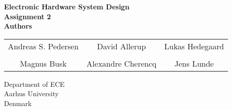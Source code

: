 \documentclass[../main.tex]{subfiles}
\begin{document}
\thispagestyle{empty}

\begin{titlepage}
    \begin{center}
        \vspace*{20pt}
        \textbf{\huge{Electronic Hardware System Design}} \\
        \vspace*{20pt}
        \textbf{\large{Assignment 2}} \\
        \vspace*{50pt}
        \textbf{\Large{Authors}} \\
        \vspace{20pt}
        \begin{tabular}{c c c}
            Andreas S. Pedersen & David Allerup & Lukas Hedegaard \\
             && \\
            Magnus Busk & Alexandre Cherencq & Jens Lunde \\
        \end{tabular}

        \vfill
        \vspace*{3cm}
        Department of ECE\\
        Aarhus University\\
        Denmark
    \end{center}
\end{titlepage}
\end{document}
